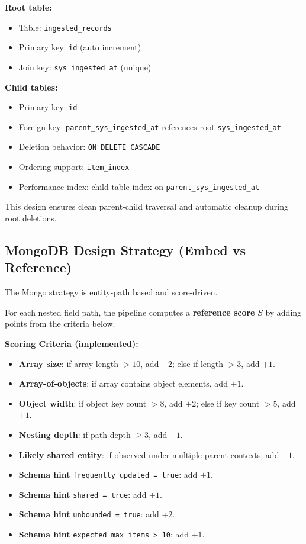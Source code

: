 \documentclass[12pt,a4paper]{article}
\begin{document}
\textbf{Root table:}
\begin{itemize}[leftmargin=*]
  \item Table: \texttt{ingested\_records}
  \item Primary key: \texttt{id} (auto increment)
  \item Join key: \texttt{sys\_ingested\_at} (unique)
\end{itemize}

\textbf{Child tables:}
\begin{itemize}[leftmargin=*]
  \item Primary key: \texttt{id}
  \item Foreign key: \texttt{parent\_sys\_ingested\_at} references root \texttt{sys\_ingested\_at}
  \item Deletion behavior: \texttt{ON DELETE CASCADE}
  \item Ordering support: \texttt{item\_index}
  \item Performance index: child-table index on \texttt{parent\_sys\_ingested\_at}
\end{itemize}

This design ensures clean parent-child traversal and automatic cleanup during root deletions.

\subsection{MongoDB Design Strategy (Embed vs Reference)}
The Mongo strategy is entity-path based and score-driven.

For each nested field path, the pipeline computes a \textbf{reference score} $S$ by adding points from the criteria below.

\textbf{Scoring Criteria (implemented):}
\begin{itemize}[leftmargin=*]
  \item \textbf{Array size}: if array length $> 10$, add $+2$; else if length $> 3$, add $+1$.
  \item \textbf{Array-of-objects}: if array contains object elements, add $+1$.
  \item \textbf{Object width}: if object key count $> 8$, add $+2$; else if key count $> 5$, add $+1$.
  \item \textbf{Nesting depth}: if path depth $\ge 3$, add $+1$.
  \item \textbf{Likely shared entity}: if observed under multiple parent contexts, add $+1$.
  \item \textbf{Schema hint} \texttt{frequently\_updated = true}: add $+1$.
  \item \textbf{Schema hint} \texttt{shared = true}: add $+1$.
  \item \textbf{Schema hint} \texttt{unbounded = true}: add $+2$.
  \item \textbf{Schema hint} \texttt{expected\_max\_items > 10}: add $+1$.
\end{itemize}
\end{document}
